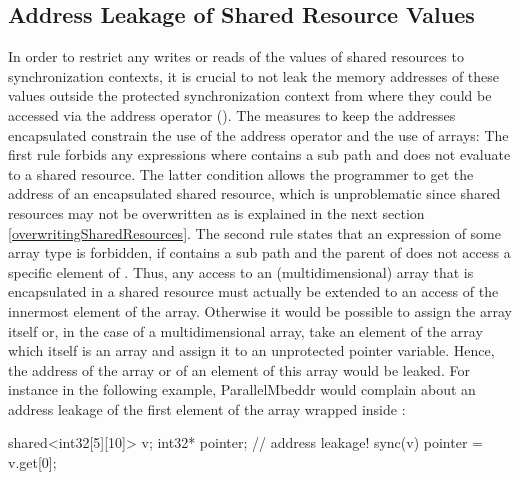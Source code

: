 \subsection{Address Leakage of Shared Resource Values}
In order to restrict any writes or reads of the values of shared resources to synchronization contexts, it is crucial to not leak the memory addresses of these values outside the protected synchronization context from where they could be accessed via the address operator (\CODE{\&}). The measures to keep the addresses encapsulated constrain the use of the address operator and the use of arrays: The first rule forbids any expressions  where  contains a sub path  and  does not evaluate to a shared resource. The latter condition allows the programmer to get the address of an encapsulated shared resource, which is unproblematic since shared resources may not be overwritten as is explained in the next section \ref{overwritingSharedResources}. The second rule states that an expression  of some array type is forbidden, if  contains a sub path  and the parent of  does not access a specific element of . Thus, any access to an (multidimensional) array that is encapsulated in a shared resource must actually be extended to an access of the innermost element of the array. Otherwise it would be possible to assign the array itself or, in the case of a multidimensional array, take an element of the array which itself is an array and assign it to an unprotected pointer variable. Hence, the address of the array or of an element of this array would be leaked. For instance in the following example, ParallelMbeddr would complain about an address leakage of the first element of the array wrapped inside :
\begin{ccode}
shared<int32[5][10]> v;
int32* pointer;
// address leakage!
sync(v) { pointer = v.get[0]; }
\end{ccode}

